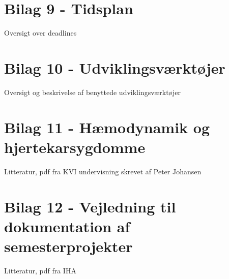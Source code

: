 \section{Bilag 9 - Tidsplan}
Oversigt over deadlines

\section{Bilag 10 - Udviklingsværktøjer}
Oversigt og beskrivelse af benyttede udviklingsværktøjer

\section{Bilag 11 - Hæmodynamik og hjertekarsygdomme}
Litteratur, pdf fra KVI undervisning skrevet af Peter Johansen

\section{Bilag 12 - Vejledning til dokumentation af semesterprojekter}
Litteratur, pdf fra IHA


